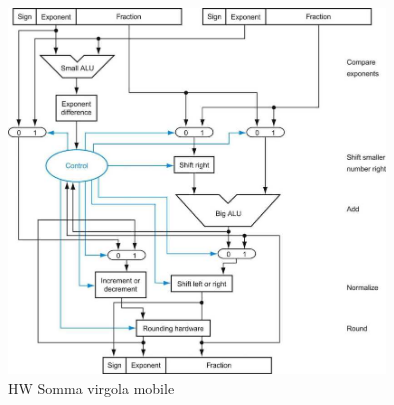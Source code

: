 \begin{figure}[H]
    \centering
    \includegraphics[width=100mm,scale=1.5]{pictures/schema-somma-virgola-mobile.png}
    \caption{HW Somma virgola mobile}
    \label{fig:hw-floating-point-addition}
\end{figure}

